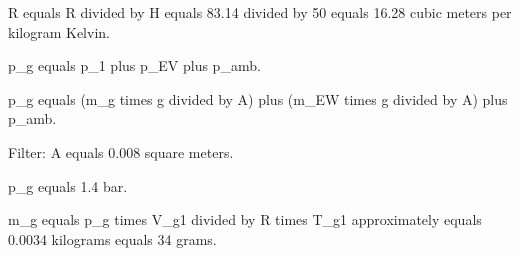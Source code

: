 R equals R divided by H equals 83.14 divided by 50 equals 16.28 cubic meters per kilogram Kelvin.  

p_g equals p_1 plus p_EV plus p_amb.  

p_g equals (m_g times g divided by A) plus (m_EW times g divided by A) plus p_amb.  

Filter: A equals 0.008 square meters.  

p_g equals 1.4 bar.  

m_g equals p_g times V_g1 divided by R times T_g1 approximately equals 0.0034 kilograms equals 34 grams.